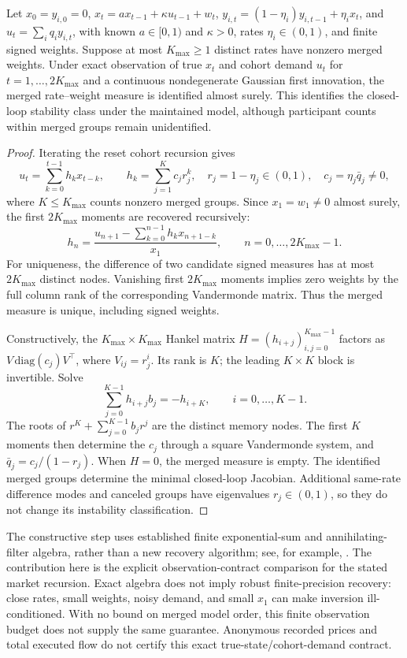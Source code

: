 \begin{proposition}
\label{prop:exact_multicohort_contract}
Let $x_0=y_{i,0}=0$, $x_t=a x_{t-1}+\kappa u_{t-1}+w_t$, $y_{i,t}=(1-\eta_i)y_{i,t-1}+\eta_i x_t$, and $u_t=\sum_i q_i y_{i,t}$, with known $a\in[0,1)$ and $\kappa>0$, rates $\eta_i\in(0,1)$, and finite signed weights. Suppose at most $K_{\max}\ge1$ distinct rates have nonzero merged weights. Under exact observation of true $x_t$ and cohort demand $u_t$ for $t=1,\ldots,2K_{\max}$ and a continuous nondegenerate Gaussian first innovation, the merged rate--weight measure is identified almost surely. This identifies the closed-loop stability class under the maintained model, although participant counts within merged groups remain unidentified.
\end{proposition}
\begin{proof}
Iterating the reset cohort recursion gives
\[
u_t=\sum_{k=0}^{t-1}h_k x_{t-k},\qquad
h_k=\sum_{j=1}^{K}c_j r_j^k,\quad r_j=1-\eta_j\in(0,1),\quad c_j=\eta_j\bar q_j\ne0,
\]
where $K\le K_{\max}$ counts nonzero merged groups. Since $x_1=w_1\ne0$ almost surely, the first $2K_{\max}$ moments are recovered recursively:
\[
h_n=\frac{u_{n+1}-\sum_{k=0}^{n-1}h_k x_{n+1-k}}{x_1},\qquad n=0,\ldots,2K_{\max}-1.
\]
For uniqueness, the difference of two candidate signed measures has at most $2K_{\max}$ distinct nodes. Vanishing first $2K_{\max}$ moments implies zero weights by the full column rank of the corresponding Vandermonde matrix. Thus the merged measure is unique, including signed weights.

Constructively, the $K_{\max}\times K_{\max}$ Hankel matrix $H=(h_{i+j})_{i,j=0}^{K_{\max}-1}$ factors as $V\,\mathrm{diag}(c_j)V^\top$, where $V_{ij}=r_j^i$. Its rank is $K$; the leading $K\times K$ block is invertible. Solve
\[
\sum_{j=0}^{K-1}h_{i+j}b_j=-h_{i+K},\qquad i=0,\ldots,K-1.
\]
The roots of $r^K+\sum_{j=0}^{K-1}b_jr^j$ are the distinct memory nodes. The first $K$ moments then determine the $c_j$ through a square Vandermonde system, and $\bar q_j=c_j/(1-r_j)$. When $H=0$, the merged measure is empty. The identified merged groups determine the minimal closed-loop Jacobian. Additional same-rate difference modes and canceled groups have eigenvalues $r_j\in(0,1)$, so they do not change its instability classification.
\end{proof}
The constructive step uses established finite exponential-sum and annihilating-filter algebra, rather than a new recovery algorithm; see, for example, \citet{vetterli2002}. The contribution here is the explicit observation-contract comparison for the stated market recursion. Exact algebra does not imply robust finite-precision recovery: close rates, small weights, noisy demand, and small $x_1$ can make inversion ill-conditioned. With no bound on merged model order, this finite observation budget does not supply the same guarantee. Anonymous recorded prices and total executed flow do not certify this exact true-state/cohort-demand contract.
